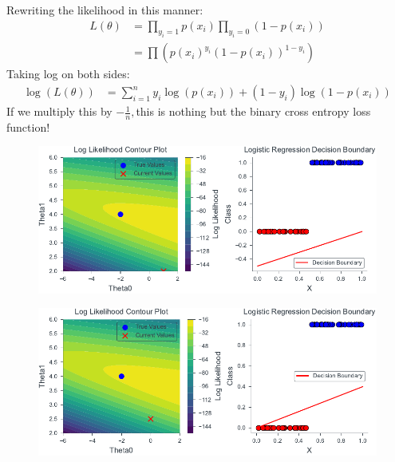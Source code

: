\documentclass[handout]{beamer}
\begin{document}
\begin{frame}
Rewriting the likelihood in this manner:
\begin{align*}
    L(\theta)&= \prod_{y_i=1}p(x_i)\prod_{y_i=0}(1-p(x_i))\\
    &=\prod\left(p(x_i)^{y_i}(1-p(x_i))^{1-y_i}\right)
\end{align*}
Taking log on both sides:\\
\begin{align*}
    \log(L(\theta)) &= \sum_{i=1}^n y_i\log(p(x_i)) + (1-y_i)\log(1-p(x_i))
\end{align*}
If we multiply this by $-\frac{1}{n},$this is nothing but the binary cross entropy loss function!
\end{frame}
\begin{frame}
    \begin{figure}
                \centerline{\includegraphics[scale=0.8]{../figures/mle/log_reg_slider_1.pdf}}
\end{figure}
\end{frame}
\begin{frame}
    \begin{figure}
                \centerline{\includegraphics[scale=0.8]{../figures/mle/log_reg_slider_2.pdf}}
\end{figure}
\end{frame}
\end{document}
